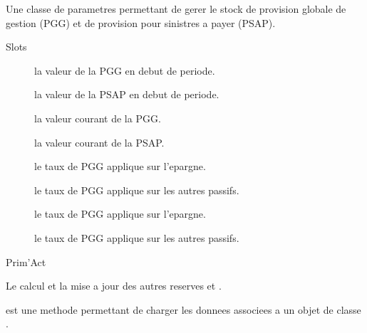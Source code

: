 \documentclass[a4paper]{book}
\begin{document}
%
\begin{Description}\relax
Une classe de parametres permettant de gerer le stock de provision globale de gestion (PGG) et de
provision pour sinistres a payer (PSAP).
\end{Description}
%
\begin{Section}{Slots}

\begin{description}

\item[] la valeur de la PGG en debut de periode.

\item[] la valeur de la PSAP en debut de periode.

\item[] la valeur courant de la PGG.

\item[] la valeur courant de la PSAP.

\item[] le taux de PGG applique sur l'epargne.

\item[] le taux de PGG applique sur les autres passifs.

\item[] le taux de PGG applique sur l'epargne.

\item[] le taux de PGG applique sur les autres passifs.

\end{description}
\end{Section}
%
\begin{Author}\relax
Prim'Act
\end{Author}
%
\begin{SeeAlso}\relax
Le calcul et la mise a jour des autres reserves  et
.
\end{SeeAlso}
%
\begin{Description}\relax
{} est une methode permettant de charger les donnees associees a un
objet de classe .
\end{Description}
\end{document}
